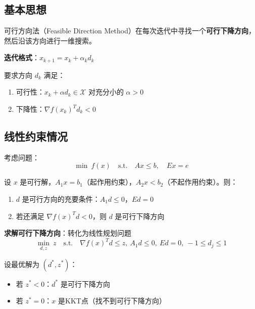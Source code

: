 \subsection{基本思想}

可行方向法（Feasible Direction Method）在每次迭代中寻找一个\textbf{可行下降方向}，然后沿该方向进行一维搜索。

\begin{algobox}[可行方向法框架]
\textbf{迭代格式}：$x_{k+1} = x_k + \alpha_k d_k$

要求方向 $d_k$ 满足：
\begin{enumerate}[label=(\arabic*)]
    \item 可行性：$x_k + \alpha d_k \in \mathcal{X}$ 对充分小的 $\alpha > 0$
    \item 下降性：$\nabla f(x_k)^T d_k < 0$
\end{enumerate}
\end{algobox}

\subsection{线性约束情况}

考虑问题：
\[
\min\ f(x)\quad \text{s.t.}\quad Ax \leq b,\quad Ex = e
\]

\begin{theorem}[可行方向判定的充要条件]
设 $x$ 是可行解，$A_1 x = b_1$（起作用约束），$A_2 x < b_2$（不起作用约束）。则：
\begin{enumerate}[label=(\arabic*)]
    \item $d$ 是可行方向的充要条件：$A_1 d \leq 0$，$Ed = 0$
    \item 若还满足 $\nabla f(x)^T d < 0$，则 $d$ 是可行下降方向
\end{enumerate}
\end{theorem}

\textbf{求解可行下降方向}：转化为线性规划问题
\[
\min_{d, z}\ z\quad \text{s.t.}\quad \nabla f(x)^T d \leq z,\ A_1 d \leq 0,\ Ed = 0,\ -1 \leq d_j \leq 1
\]

\begin{notebox}[判定准则]
设最优解为 $(d^*, z^*)$：
\begin{itemize}[itemsep=0.3em]
    \item 若 $z^* < 0$：$d^*$ 是可行下降方向
    \item 若 $z^* = 0$：$x$ 是KKT点（找不到可行下降方向）
\end{itemize}
\end{notebox}


